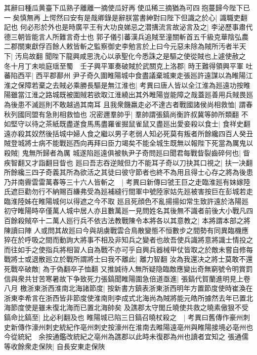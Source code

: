 其辭曰種瓜黄臺下瓜熟子離離一摘使瓜好再使瓜稀三摘猶為可四抱蔓歸今陛下已一矣慎無再上愕然曰安有是哉卿錄是辭朕當書紳對曰陛下但識之於心|{
	識職吏翻記也}
何必形於外也是時廣平王有大功良娣忌之潜搆流言故泌言及之|{
	李泌歷事肅代德三朝皆能言人所難言奇士也}
郭子儀引蕃漢兵追賊至潼關斬首五千級克華陰弘農二郡關東獻俘百餘人敕皆斬之監察御史李勉言於上曰今元惡未除為賊所汚者半天下|{
	汚烏故翻}
聞陛下龍興咸思洗心以承聖化今悉誅之是驅之使從賊也上遽使赦之　冬十月丁未啖庭瑶至蜀　壬子興平軍奏破賊於武關克上洛郡|{
	時王難得領興平軍}
吐蕃陷西平|{
	西平郡鄯州}
尹子奇久圍睢陽城中食盡議棄城東走張廵許遠謀以為睢陽江淮之保障若棄之去賊必乘勝長驅是無江淮也|{
	考異曰唐人皆以全江淮為廵遠功按睢陽雖當江淮之路城既被圍賊若欲取江淮繞出其外睢陽豈能障之哉蓋廵善用兵賊畏廵為後患不滅廵則不敢越過其南耳}
且我衆饑羸走必不達古者戰國諸侯尚相救恤|{
	謂春秋列國同盟有急則相救恤也}
况密邇羣帥乎|{
	羣帥謂張鎬尚衡許叔冀等帥所類翻}
不如堅守以待之茶紙既盡遂食馬馬盡羅雀掘鼠雀鼠又盡廵出愛妾殺以食士|{
	食祥史翻}
遠亦殺其奴然後括城中婦人食之繼以男子老弱人知必死莫有叛者所餘纔四百人癸丑賊登城將士病不能戰廵西向再拜曰臣力竭矣不能全城生既無以報陛下死當為厲鬼以殺賊|{
	鬼無所歸者為厲}
城遂陷廵遠俱被執尹子奇問廵曰聞君每戰眥裂齒碎何也|{
	眥疾智翻又才詣翻目眥也}
廵曰吾志吞逆賊但力不能耳子奇以刀抉其口視之|{
	扶一决翻}
所餘纔三四子奇義其所為欲活之其徒曰彼守節者也終不為用且得士心存之將為後患乃并南霽雲雷萬春等三十六人皆斬之　|{
	考異曰新傳曰虢王巨之走臨淮廵有妹嫁陸氏遮巨勸勿行不納賜百縑弗受為廵補縫行間軍中號陸家姑先廵被害按巨在彭城若走臨淮陸姊在睢陽城何以得遮之今不取}
廵且死顔色不亂揚揚如常生致許遠於洛陽廵初守睢陽時卒僅萬人城中居人亦且數萬廵一見問姓名其後無不識者前後大小戰凡四百餘殺賊卒十二萬人廵行兵不依古法教戰陳令本將各以其意教之|{
	本將謂本部之將陳讀曰陣}
人或問其故廵曰今與胡虜戰雲合鳥散變態不恒數步之間勢有同異臨機應猝在於呼吸之間而動詢大將事不相及非知兵之變者也故吾使兵識將意將識士情投之而往如手之使指兵將相習人自為戰不亦可乎自興兵器械甲仗皆取之於敵未嘗自修每戰將士或退散廵立於戰所謂將士曰我不離此|{
	離力智翻}
汝為我還决之將士莫敢不還死戰卒破敵|{
	為于偽翻卒子恤翻}
又推誠待人無所疑隐臨敵應變出奇無窮號令明賞罰信與衆共甘苦寒暑故下争致死力張鎬聞睢陽圍急倍道亟進|{
	張鎬代賀蘭進明見上卷八月}
檄浙東浙西淮南北海諸節度|{
	按新書方鎮表浙東浙西明年方置節度使時崔渙在浙東李希言在浙西皆非節度使淮南則李成式北海尚為賊將能元皓所據然去年已置北海節度使是雖未復北海而已置北海帥矣}
及譙郡太守閭丘曉使共救之曉素傲狠不受鎬命比鎬至|{
	比必利翻及也}
睢陽城已陷三日鎬召曉杖殺之　|{
	考異曰舊傳作豪州刺史新傳作濠州刺史統紀作亳州刺史按濠州在淮南去睢陽遠亳州與睢陽接境必亳州也今從統紀　余按通鑑改統紀之亳州為譙郡以此時未復郡為州也讀者宜知之}
張通儒等收餘衆走保陜|{
	自長安東走保陜}
